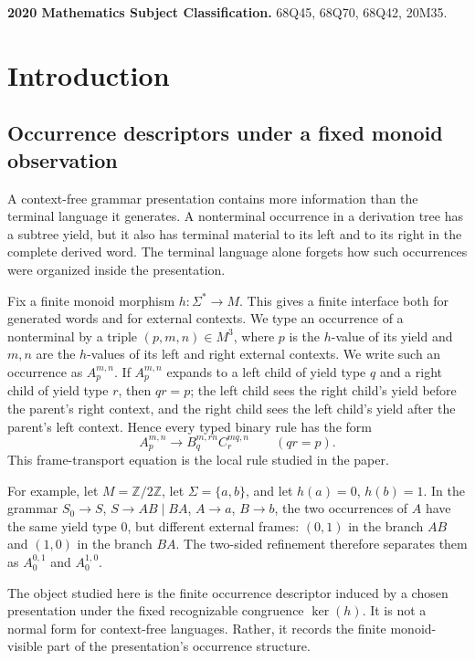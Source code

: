 \documentclass[sub]{jalc}
\begin{document}
\noindent\textbf{2020 Mathematics Subject Classification.}
68Q45, 68Q70, 68Q42, 20M35.


\section{Introduction}
\label{sec:intro}

\subsection{Occurrence descriptors under a fixed monoid observation}
\label{subsec:presentation-level}

A context-free grammar presentation contains more information than the terminal
language it generates.  A nonterminal occurrence in a derivation tree has a
subtree yield, but it also has terminal material to its left and to its right in
the complete derived word.  The terminal language alone forgets how such
occurrences were organized inside the presentation.

Fix a finite monoid morphism \(h:\Sigma^*\to M\).  This gives a finite
interface both for generated words and for external contexts.  We type an
occurrence of a nonterminal by a triple \((p,m,n)\in M^3\), where \(p\) is the
\(h\)-value of its yield and \(m,n\) are the \(h\)-values of its left and right
external contexts.  We write such an occurrence as \(A_p^{m,n}\).  If
\(A_p^{m,n}\) expands to a left child of yield type \(q\) and a right child of
yield type \(r\), then \(qr=p\); the left child sees the right child's yield
before the parent's right context, and the right child sees the left child's
yield after the parent's left context.  Hence every typed binary rule has the
form
\[
  A_p^{m,n}\to B_q^{m,rn}C_r^{mq,n}\qquad(qr=p).
\]
This frame-transport equation is the local rule studied in the paper.

For example, let \(M=\mathbb Z/2\mathbb Z\), let \(\Sigma=\{a,b\}\), and let
\(h(a)=0\), \(h(b)=1\).  In the grammar \(S_0\to S\),
\(S\to AB\mid BA\), \(A\to a\), \(B\to b\), the two occurrences of \(A\) have
the same yield type \(0\), but different external frames: \((0,1)\) in the
branch \(AB\) and \((1,0)\) in the branch \(BA\).  The two-sided refinement
therefore separates them as \(A_0^{0,1}\) and \(A_0^{1,0}\).

The object studied here is the finite occurrence descriptor induced by a chosen
presentation under the fixed recognizable congruence \(\ker(h)\).  It is not a
normal form for context-free languages.  Rather, it records the finite
monoid-visible part of the presentation's occurrence structure.
\end{document}
